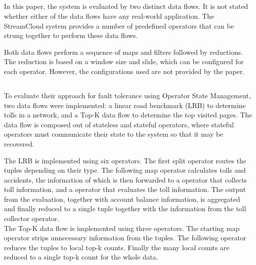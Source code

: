 \subsection{}
In this paper\cite{streamcloud}, the system is evaluated by two distinct data flows. It is not stated whether either of the data flows have any real-world application. The StreamCloud system provides a number of predefined operators that can be strung together to perform these data flows. \\


Both data flows perform a sequence of maps and filters followed by reductions. The reduction is based on a window size and slide, which can be configured for each operator. However, the configurations used are not provided by the paper.

\subsection{}
To evaluate their approach for fault tolerance using Operator State Management\cite{integrating}, two data flows were implemented: a linear road benchmark (LRB) to determine tolls in a network, and a Top-K data flow to determine the top visited pages. The data flow is composed out of stateless and stateful operators, where stateful operators must communicate their state to the system so that it may be recovered. \\


The LRB is implemented using six operators. The first split operator routes the tuples depending on their type. The following map operator calculates tolls and accidents, the information of which is then forwarded to a operator that collects toll information, and a operator that evaluates the toll information. The output from the evaluation, together with account balance information, is aggregated and finally reduced to a single tuple together with the information from the toll collector operator. \\

The Top-K data flow is implemented using three operators. The starting map operator strips unnecessary information from the tuples. The following operator reduces the tuples to local top-k counts. Finally the many local counts are reduced to a single top-k count for the whole data.

